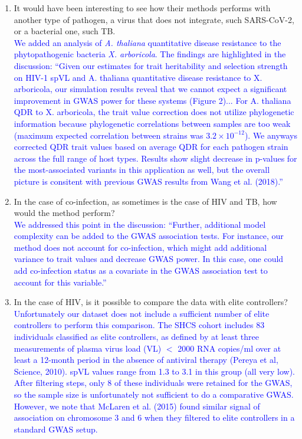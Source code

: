 \documentclass[11pt]{article}
\begin{document}
\begin{enumerate}
    \item It would have been interesting to see how their methods performs with another type of pathogen, a virus that does not integrate, such SARS-CoV-2, or a bacterial one, such TB. \\
    \textcolor{blue}{We added an analysis of \emph{A. thaliana} quantitative disease resistance to the phytopathogenic bacteria \emph{X. arboricola}. The findings are highlighted in the discussion: ``Given our estimates for trait heritability and selection strength on HIV-1 spVL and A. thaliana quantitative disease resistance to X. arboricola, our simulation results reveal that we cannot expect a significant improvement in GWAS power for these systems (Figure 2)... For A. thaliana QDR to X. arboricola, the trait value correction does not utilize phylogenetic information because phylogenetic correlations between samples are too weak (maximum expected correlation between strains was $3.2 \times 10^{-12}$). We anyways corrected QDR trait values based on average QDR for each pathogen strain across the full range of host types. Results show slight decrease in p-values for the most-associated variants in this application as well, but the overall picture is consitent with previous GWAS results from Wang et al. (2018).''}
    \item In the case of co-infection, as sometimes is the case of HIV and TB, how would the method perform? \\
    \textcolor{blue}{We addressed this point in the discussion: ``Further, additional model complexity can be added to the GWAS association tests. For instance, our method does not account for co-infection, which might add additional variance to trait values and decrease GWAS power. In this case, one could add co-infection status as a covariate in the GWAS association test to account for this variable.''}
    \item In the case of HIV, is it possible to compare the data with elite controllers? \\
    \textcolor{blue}{Unfortunately our dataset does not include a sufficient number of elite controllers to perform this comparison. The SHCS cohort includes 83 individuals classified as elite controllers, as defined by at least three measurements of plasma virus load (VL) $<$ 2000 RNA copies/ml over at least a 12-month period in the absence of antiviral therapy (Pereya et al, Science, 2010). spVL values range from 1.3 to 3.1 in this group (all very low). After filtering steps, only 8 of these individuals were retained for the GWAS, so the sample size is unfortunately not sufficient to do a comparative GWAS. However, we note that McLaren et al. (2015) found similar signal of association on chromosome 3 and 6 when they filtered to elite controllers in a standard GWAS setup.}

\end{enumerate}
\end{document}
